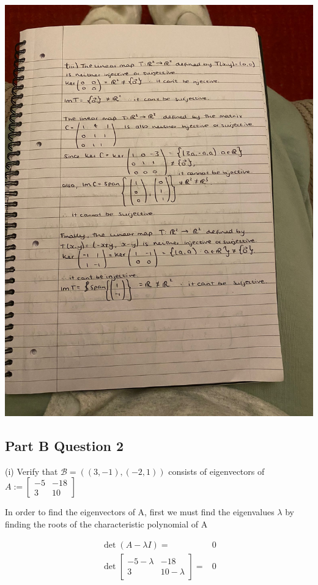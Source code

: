 \documentclass{article}
\begin{document}
\includegraphics[scale = 0.2]{IMG-20231126-WA0004.jpg}



\break








\subsection*{Part B Question 2}
(i)
Verify that $ \mathcal{B}=((3,-1),(-2,1)) $ consists of eigenvectors of $A := \begin{bmatrix}
    -5 & -18 \\ 3 & 10
\end{bmatrix}$

In order to find the eigenvectors of A, first we must find the eigenvalues $\lambda$ by finding the roots of the characteristic polynomial of A

\begin{align*}
    \det(A-\lambda I) =& 0 \\
    \det \begin{bmatrix}
        -5-\lambda & -18 \\ 3 & 10 - \lambda
    \end{bmatrix}
    =& 0
\end{align*}
\end{document}
